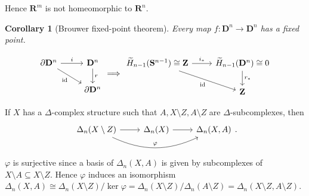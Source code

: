 \documentclass[11pt]{article}
\theoremstyle{definition}
\theoremstyle{plain}
\newtheorem*{corollary}{Corollary}
\theoremstyle{remark}
\newcommand{\id}{\textup{id}}
\newcommand{\R}{\mathbf{R}}
\newcommand{\Z}{\mathbf{Z}}
\begin{document}
Hence $\R^m$ is not homeomorphic to $\R^n$.

\begin{corollary}[Brouwer fixed-point theorem]
Every map $f:\mathbf{D}^n\to\mathbf{D}^n$ has a fixed point.
\end{corollary}
\[\begin{tikzcd}
\partial\mathbf{D}^n\arrow[swap]{dr}{\id}\arrow{r}{i}&\mathbf{D}^n\arrow{d}{r}\\
&\partial\mathbf{D}^n
\end{tikzcd}\Longrightarrow\begin{tikzcd}
\widetilde{H}_{n-1}(\mathbf{S}^{n-1})\cong\Z\arrow[swap]{dr}{\id}\arrow{r}{i_\ast}&\widetilde{H}_{n-1}(\mathbf{D}^n)\cong0\arrow{d}{r_\ast}\\
&\Z
\end{tikzcd}\]

If $X$ has a $\Delta$-complex structure such that $A,X\setminus Z,A\setminus Z$ are $\Delta$-subcomplexes, then
\[\begin{tikzcd}
\Delta_n(X\setminus Z)\arrow[bend right=25]{rr}{\varphi}\arrow{r}&\Delta_n(X)\arrow[r]&\Delta_n(X,A)
\end{tikzcd}.\]
$\varphi$ is surjective since a basis of $\Delta_n(X,A)$ is given by subcomplexes of $X\setminus A\subseteq X\setminus Z$. Hence $\varphi$ induces an isomorphism $\Delta_n(X,A)\cong\Delta_n(X\setminus Z)/\ker\varphi=\Delta_n(X\setminus Z)/\Delta_n(A\setminus Z)=\Delta_n(X\setminus Z,A\setminus Z)$.
\end{document}
